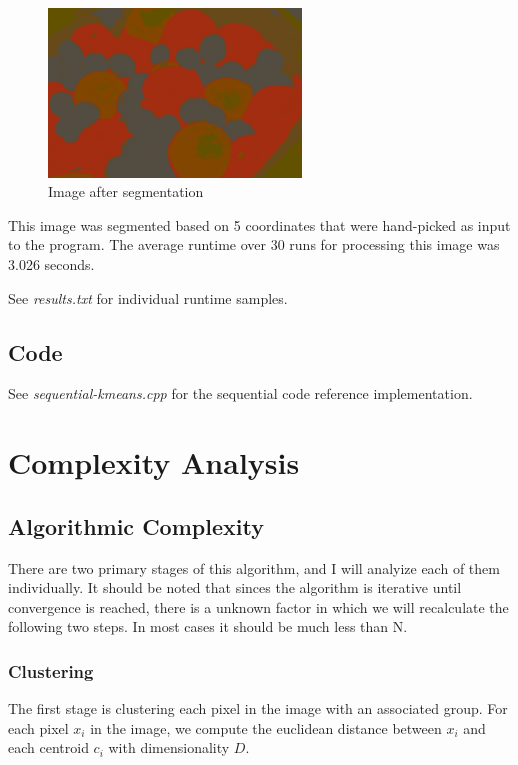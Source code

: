 \documentclass[11pt]{article}
\begin{document}
\begin{figure}[ht]
    \centering
    \includegraphics[width=0.6\textwidth]{fruit-segmented.png}
    \caption{Image after segmentation}
    \label{fig:fruit-segmented}
\end{figure}

This image was segmented based on 5 coordinates that were hand-picked as input to the program.
The average runtime over 30 runs for processing this image was 3.026 seconds.

See \emph{results.txt} for individual runtime samples.

\subsection{Code}

See \emph{sequential-kmeans.cpp} for the sequential code reference implementation.

\section{Complexity Analysis}

\subsection{Algorithmic Complexity}

There are two primary stages of this algorithm, and I will analyize each of them individually.
It should be noted that sinces the algorithm is iterative until convergence is reached, there
is a unknown factor in which we will recalculate the following two steps. In most cases it
should be much less than N.

\subsubsection{Clustering}

The first stage is clustering each pixel in the image with an associated group. For
each pixel $x_i$ in the image, we compute the euclidean distance between $x_i$
and each centroid $c_i$ with dimensionality $D$.
\end{document}
